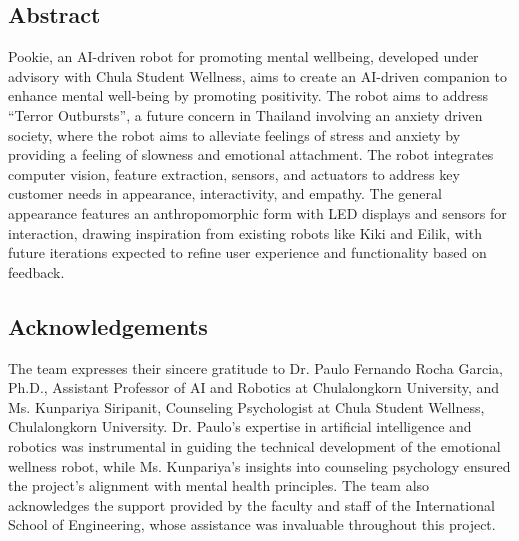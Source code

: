 \documentclass[a4paper,10pt]{article}
\begin{document}
\newpage
\begin{center}
        \item\section*{Abstract}
\end{center}
\large
Pookie, an AI-driven robot for promoting mental wellbeing, developed under advisory with Chula Student Wellness, aims to create an AI-driven companion to enhance mental well-being by promoting positivity. The robot aims to address “Terror Outbursts”, a future concern in Thailand involving an anxiety driven society, where the robot aims to alleviate feelings of stress and anxiety by providing a feeling of slowness and emotional attachment. The robot integrates computer vision, feature extraction, sensors, and actuators to address key customer needs in appearance, interactivity, and empathy. The general appearance features an anthropomorphic form with LED displays and sensors for interaction, drawing inspiration from existing robots like Kiki and Eilik, with future iterations expected to refine user experience and functionality based on feedback.  
\newpage
\begin{center}
        \item\section*{Acknowledgements}
\end{center}
The team expresses their sincere gratitude to Dr. Paulo Fernando Rocha Garcia, Ph.D., Assistant Professor of AI and Robotics at Chulalongkorn University, and Ms. Kunpariya Siripanit, Counseling Psychologist at Chula Student Wellness, Chulalongkorn University. Dr. Paulo’s expertise in artificial intelligence and robotics was instrumental in guiding the technical development of the emotional wellness robot, while Ms. Kunpariya’s insights into counseling psychology ensured the project’s alignment with mental health principles. The team also acknowledges the support provided by the faculty and staff of the International School of Engineering, whose assistance was invaluable throughout this project.
\normalsize

\newpage
\tableofcontents

\newpage
\begin{center}

\end{center}

\newpage

\newpage

\newpage

\newpage

\newpage

\newpage

\newpage

\newpage


\newpage
{}


\end{document}
